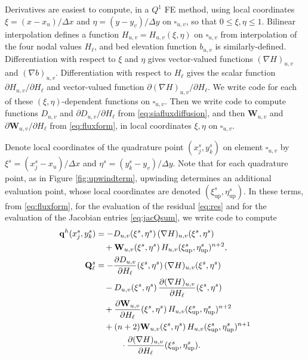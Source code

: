 \documentclass[review,letterpaper]{igs}
\newcommand\bq{\mathbf{q}}
\newcommand\bQ{\mathbf{Q}}
\newcommand\bW{\mathbf{W}}
\newcommand{\grad}{\nabla}
\begin{document}
\newcommand{\uppoint}{(\xi_{\text{up}}^s,\eta_{\text{up}}^s)}
Derivatives are easiest to compute, in a $Q^1$ FE method, using local coordinates $\xi=(x-x_u)/\Delta x$ and $\eta=(y-y_v)/\Delta y$ on $\square_{u,v}$, so that $0\le \xi,\eta \le 1$.  Bilinear interpolation defines a function $H_{u,v}=H_{u,v}(\xi,\eta)$ on $\square_{u,v}$ from interpolation of the four nodal values $H_\ell$, and bed elevation function $b_{u,v}$ is similarly-defined.  Differentiation with respect to $\xi$ and $\eta$ gives vector-valued functions $(\grad H)_{u,v}$ and $(\grad b)_{u,v}$.  Differentiation with respect to $H_\ell$ gives the scalar function $\partial H_{u,v}/\partial H_\ell$ and vector-valued function $\partial (\grad H)_{u,v}/\partial H_\ell$.  We write code for each of these $(\xi,\eta)$-dependent functions on $\square_{u,v}$.  Then we write code to compute functions $D_{u,v}$ and $\partial D_{u,v}/\partial H_\ell$ from \eqref{eq:siafluxdiffusion}, and then $\bW_{u,v}$ and $\partial \bW_{u,v}/\partial H_\ell$ from \eqref{eq:fluxform}, in local coordinates $\xi,\eta$ on $\square_{u,v}$.

Denote local coordinates of the quadrature point $(x_j^s,y_k^s)$ on element $\square_{u,v}$ by $\xi^s = (x_j^s-x_u)/\Delta x$ and $\eta^s = (y_k^s-y_v)/\Delta y$.  Note that for each quadrature point, as in Figure \ref{fig:upwindterm}, upwinding determines an additional evaluation point, whose local coordinates are denoted $\uppoint$.  In these terms, from \eqref{eq:fluxform}, for the evaluation of the residual \eqref{eq:res} and for the evaluation of the Jacobian entries \eqref{eq:jacQsum}, we write code to compute
\begin{align}
\bq^h(x_j^s,y_k^s) &= - D_{u,v}(\xi^s,\eta^s)\, (\grad H)_{u,v}(\xi^s,\eta^s) \label{eq:resfinalformula} \\
   &\quad + \bW_{u,v}(\xi^s,\eta^s) \, H_{u,v}\uppoint^{n+2}, \notag \\
\bQ_\ell^s &= - \frac{\partial D_{u,v}}{\partial H_\ell}(\xi^s,\eta^s)\, (\grad H)_{u,v}(\xi^s,\eta^s) \label{eq:jacfinalformula} \\
   &\quad - D_{u,v}(\xi^s,\eta^s)\, \frac{\partial (\grad H)_{u,v}}{\partial H_\ell}(\xi^s,\eta^s) \notag \\
   &\quad + \frac{\partial \bW_{u,v}}{\partial H_\ell}(\xi^s,\eta^s) \, H_{u,v}\uppoint^{n+2} \notag \\
   &\quad + (n+2) \bW_{u,v}(\xi^s,\eta^s)\, H_{u,v}\uppoint^{n+1} \notag \\
   &\qquad\quad \cdot \frac{\partial (\grad H)_{u,v}}{\partial H_\ell}\uppoint. \notag
\end{align}
\end{document}
